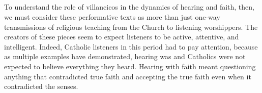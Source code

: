 \subsection{}

To understand the role of villancicos in the dynamics of hearing and faith,
then, we must consider these performative texts as more than just one-way
transmissions of religious teaching from the Church to listening worshippers.
The creators of these pieces seem to expect listeners to be active, attentive,
and intelligent.
Indeed, Catholic listeners in this period had to pay attention, because as
multiple examples have demonstrated, hearing was  and Catholics were not expected to believe everything they heard.
Hearing with faith meant questioning anything that contradicted true faith and
accepting the true faith even when it contradicted the senses.

